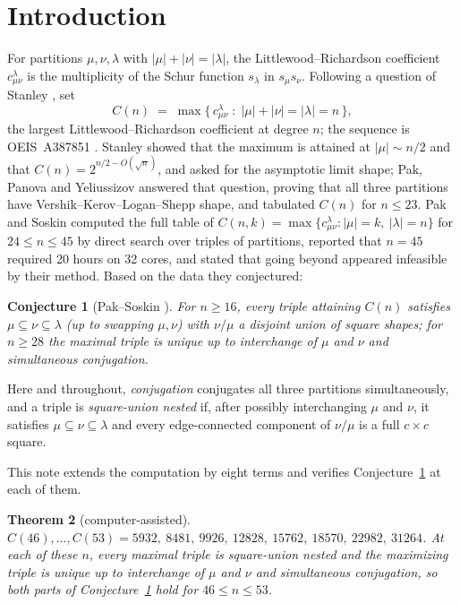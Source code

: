\documentclass[11pt]{article}
\newtheorem{theorem}{Theorem}[section]
\newtheorem{conjecture}[theorem]{Conjecture}
\theoremstyle{remark}
\newcommand{\lam}{\lambda}
\begin{document}
\section{Introduction}

For partitions $\mu,\nu,\lam$ with $|\mu|+|\nu|=|\lam|$, the Littlewood--Richardson
coefficient $c^{\lam}_{\mu\nu}$ is the multiplicity of the Schur function $s_\lam$ in
$s_\mu s_\nu$. Following a question of Stanley \cite[Exc.~82(c)]{Sta23}, set
\[
C(n)\;=\;\max\bigl\{\,c^{\lam}_{\mu\nu}\;:\;|\mu|+|\nu|=|\lam|=n\,\bigr\},
\]
the largest Littlewood--Richardson coefficient at degree $n$; the sequence is
OEIS~A387851 \cite{OEIS}. Stanley showed that the maximum is attained at
$|\mu|\sim n/2$ and that $C(n)=2^{n/2-O(\sqrt{n})}$, and asked for the asymptotic limit
shape; Pak, Panova and Yeliussizov \cite{PPY19} answered that question, proving that all
three partitions have Vershik--Kerov--Logan--Shepp shape, and tabulated $C(n)$ for
$n\le 23$. Pak and Soskin \cite{PS26} computed the full table of
$C(n,k)=\max\{c^{\lam}_{\mu\nu}:|\mu|=k,\ |\lam|=n\}$ for $24\le n\le 45$ by direct
search over triples of partitions, reported that $n=45$ required 20 hours on 32 cores,
and stated that going beyond appeared infeasible by their method. Based on the data they
conjectured:

\begin{conjecture}[{Pak--Soskin \cite[Conj.~1.1]{PS26}}]\label{conj:ps}
For $n\ge 16$, every triple attaining $C(n)$ satisfies
$\mu\subseteq\nu\subseteq\lam$ (up to swapping $\mu,\nu$) with $\nu/\mu$ a disjoint
union of square shapes; for $n\ge 28$ the maximal triple is unique up to
interchange of $\mu$ and $\nu$ and simultaneous conjugation.
\end{conjecture}

Here and throughout,
\emph{conjugation} conjugates all three partitions simultaneously, and a triple is
\emph{square-union nested} if, after possibly interchanging $\mu$ and $\nu$, it
satisfies $\mu\subseteq\nu\subseteq\lam$ and every edge-connected component of
$\nu/\mu$ is a full $c\times c$ square.

This note extends the computation by eight terms and verifies
Conjecture~\ref{conj:ps} at each of them.

\begin{theorem}[computer-assisted]\label{thm:main}
$C(46),\dots,C(53)=5932,\ 8481,\ 9926,\ 12828,\ 15762,\ 18570,\ 22982,\ 31264$. At
each of these $n$, every maximal triple is square-union nested and the maximizing triple
is unique up
to interchange of $\mu$ and $\nu$ and simultaneous conjugation, so both parts of
Conjecture~\ref{conj:ps} hold for $46\le n\le 53$.
\end{theorem}
\end{document}
